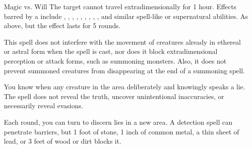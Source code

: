 \begin{spellheader}
    \spellrng{\rngmed}
\end{spellheader}
\begin{spelleffects}
    \begin{spellattack}{Magic vs. Will}
        \spellsuccess  The target cannot travel extradimensionally for 1 hour. Effects barred by a  include , , , , , , , , , and similar spell-like or supernatural abilities.
        \spellfailure As above, but the effect lasts for 5 rounds.
    \end{spellattack}
\end{spelleffects}
\begin{spellfooter}
    \spellnotes This spell does not interfere with the movement of creatures already in ethereal or astral form when the spell is cast, nor does it block extradimensional perception or attack forms, such as summoning monsters. Also, it does not prevent summoned creatures from disappearing at the end of a summoning spell.
\end{spellfooter}

\begin{spellheader}
\end{spellheader}
\begin{spelleffects}
    \spelleffect You know when any creature in the area deliberately and knowingly speaks a lie. The spell does not reveal the truth, uncover unintentional inaccuracies, or necessarily reveal evasions.
\end{spelleffects}
\begin{spellfooter}
    \spellnotes Each round, you can turn to discern lies in a new area. A detection spell can penetrate barriers, but 1 foot of stone, 1 inch of common metal, a thin sheet of lead, or 3 feet of wood or dirt blocks it.
\end{spellfooter}

